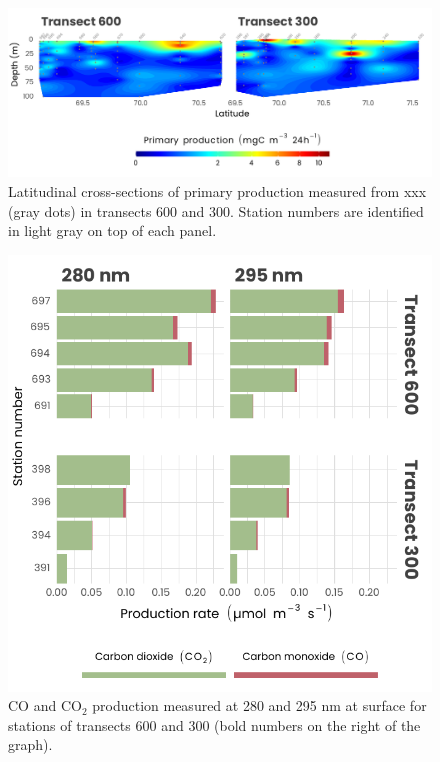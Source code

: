 \documentclass[essd, manuscript]{copernicus}
\begin{document}
\clearpage

\begin{figure}[H]
	\centering
	\includegraphics[scale = 1]{../../../graphs/fig09.pdf}
	\caption{Latitudinal cross-sections of primary production measured from xxx (gray dots) in transects 600 and 300. Station numbers are identified in light gray on top of each panel.}
\end{figure}

\clearpage

\begin{figure}[H]
	\centering
	\includegraphics[scale = 1]{../../../graphs/fig10.pdf}
	\caption{CO and CO$_2$ production measured at 280 and 295 nm at surface for stations of transects 600 and 300 (bold numbers on the right of the graph).}
\end{figure}
\end{document}
